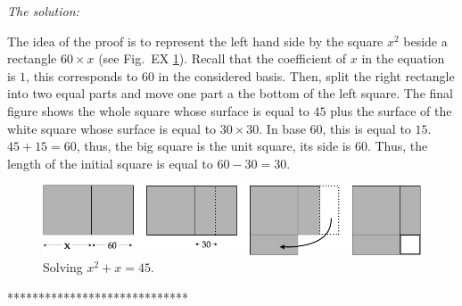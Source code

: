 {\noindent \textit{The solution:}

The idea of the proof is to represent the left hand side by the square $x^2$ beside a rectangle $60 \times x$
(see Fig.~EX \ref{fig:equationBabillon}).
Recall that the coefficient of $x$ in the equation is $1$, this corresponds to $60$ in the considered basis. 
Then, split the right rectangle into two equal parts and move one part a the bottom of the left square.
The final figure shows the whole square whose surface is equal to $45$ plus the surface of the white square
whose surface is equal to $30 \times 30$.
In base $60$, this is equal to $15$. 
$45+15 = 60$, thus, the big square is the unit square, its side is $60$.
Thus, the length of the initial square is equal to $60-30=30$.
\begin{figure}[htb]
\begin{center}
       \includegraphics[scale=0.4]{FiguresArithmetic/tabletteMesopotamie}
\caption{Solving $x^2 + x = 45$.}
\label{fig:equationBabillon}
\end{center}
\end{figure}
*****************************}





